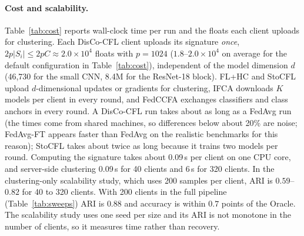 \paragraph{Cost and scalability.}\label{sec:cost}
Table~\ref{tab:cost} reports wall-clock time per run and the floats each client uploads for clustering. Each DisCo-CFL client uploads its signature \emph{once}, $2p|S_i|\le2pC\approx2.0\times10^4$ floats with $p=1024$ ($1.8$--$2.0\times10^4$ on average for the default configuration in Table~\ref{tab:cost}), independent of the model dimension $d$ (46{,}730 for the small CNN, 8.4M for the ResNet-18 block). FL+HC and StoCFL upload $d$-dimensional updates or gradients for clustering, IFCA downloads $K$ models per client in every round, and FedCCFA exchanges classifiers and class anchors in every round. A DisCo-CFL run takes about as long as a FedAvg run (the times come from shared machines, so differences below about 20\% are noise; FedAvg-FT appears faster than FedAvg on the realistic benchmarks for this reason); StoCFL takes about twice as long because it trains two models per round. Computing the signature takes about 0.09\,s per client on one CPU core, and server-side clustering 0.09\,s for 40 clients and 6\,s for 320 clients. In the clustering-only scalability study, which uses 200 samples per client, ARI is $0.59$--$0.82$ for 40 to 320 clients. With 200 clients in the full pipeline (Table~\ref{tab:sweeps}) ARI is $0.88$ and accuracy is within $0.7$ points of the Oracle. The scalability study uses one seed per size and its ARI is not monotone in the number of clients, so it measures time rather than recovery.

\begin{tableorg}[!htbp]
\centering
\caption{Cost per run: mean wall-clock time (minutes; one CPU core for the small CNN, one GPU for the realistic benchmarks) and floats uploaded per client for the clustering signal. DisCo-AS: label-free warm-up (Section~\ref{sec:warmup}); DisCo-full: signature from the gradient of the whole layer-4 block (realistic benchmarks); DisCo-linkorder, DisCo-mean, DisCo-noClass, DisCo-noClip and DisCo-noDisatt: the ablation variants of Table~\ref{tab:abl} (linkage-ordered merging, mean linkage, without class conditioning, without clipping, without disattenuation).}\label{tab:cost}

\end{tableorg}
